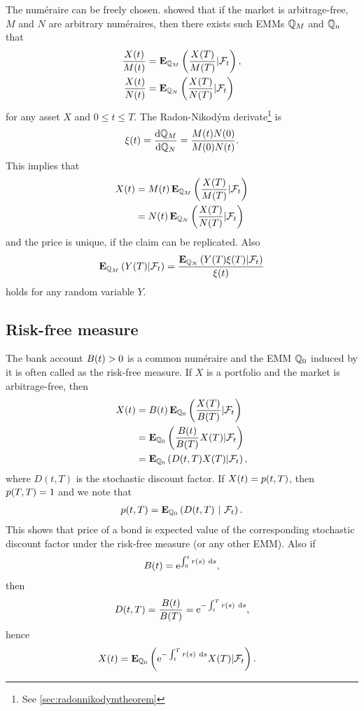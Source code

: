 The num\'{e}raire can be freely chosen. \cite{gemanelkarouirochet1995changes} showed that if the market is arbitrage-free, $M$ and $N$ are arbitrary num\'{e}raires, then there exists such EMMs $\mathbb{Q}_M$ and $\mathbb{Q}_n$ that
	\begin{align}
		\frac{X(t)}{M(t)} &= \operatorname{\boldsymbol{\mathrm{E}}}_{\mathbb{Q}_M} \left( \frac{X(T)}{M(T)} | \mathcal{F}_t \right), \\
		\frac{X(t)}{N(t)} &= \operatorname{\boldsymbol{\mathrm{E}}}_{\mathbb{Q}_N} \left( \frac{X(T)}{N(T)} | \mathcal{F}_t \right)
	\end{align}
for any asset $X$ and $0 \leq t \leq T$. The Radon-Nikod\'{y}m derivate\footnote{See \ref{sec:radonnikodymtheorem}} is
	\begin{align}
		\xi(t) = \frac{\mathrm{d} \mathbb{Q}_M}{\mathrm{d} \mathbb{Q}_N} = \frac{M(t) N(0)}{M(0) N(t)} .
	\end{align}
This implies that
	\begin{align}
		X(t) &= M(t) \operatorname{\boldsymbol{\mathrm{E}}}_{\mathbb{Q}_M} \left( \frac{X(T)}{M(T)} | \mathcal{F}_t \right) \\ 
		&= N(t) \operatorname{\boldsymbol{\mathrm{E}}}_{\mathbb{Q}_N} \left( \frac{X(T)}{N(T)} | \mathcal{F}_t \right)
\end{align}
and the price is unique, if the claim can be replicated. Also
	\begin{align}
		\label{expectationbyradonnikodymderivative}
		\operatorname{\boldsymbol{\mathrm{E}}}_{\mathbb{Q}_M} \left( Y(T) | \mathcal{F}_t \right) = \frac{\operatorname{\boldsymbol{\mathrm{E}}}_{\mathbb{Q}_N} \left( Y(T) \xi(T)  | \mathcal{F}_t \right)}{\xi(t)} 
	\end{align}
holds for any random variable $Y$.

\subsection{Risk-free measure}

The bank account $B(t) > 0$ is a common num\'{e}raire and the EMM $\mathbb{Q}_0$ induced by it is often called as the risk-free measure. If $X$ is a portfolio and the market is arbitrage-free, then
	\begin{align}
		\label{pricingunderriskneutralmeasure}
		X(t) &= B(t) \operatorname{\boldsymbol{\mathrm{E}}}_{\mathbb{Q}_0} \left( \frac{X(T)}{B(T)} | \mathcal{F}_t \right) \\
			&= \operatorname{\boldsymbol{\mathrm{E}}}_{\mathbb{Q}_0} \left( \frac{B(t)}{B(T) } X(T) | \mathcal{F}_t \right) \\
			&= \operatorname{\boldsymbol{\mathrm{E}}}_{\mathbb{Q}_0} \left( D(t,T) X(T)  | \mathcal{F}_t \right),
	\end{align}
where $D(t,T)$ is the stochastic discount factor. If $X(t) = p(t,T)$, then $p(T,T)=1$ and we note that
	\begin{align}
		p(t,T) = \operatorname{\boldsymbol{\mathrm{E}}}_{\mathbb{Q}_0} \left( D(t,T) \ | \ \mathcal{F}_t \right) .
	\end{align}
This shows that price of a bond is expected value of the corresponding stochastic discount factor under the risk-free measure (or any other EMM). Also if
	\begin{align}
		B(t) = \mathrm{e}^{ \int_0^t r(s) \ \mathrm{d} s },
	\end{align}
then
	\begin{align}
		D(t,T) = \frac{B(t)}{B(T)} = \mathrm{e}^{ - \int_t^T r(s) \ \mathrm{d} s },
	\end{align}
hence
	\begin{align}
		X(t) &= \operatorname{\boldsymbol{\mathrm{E}}}_{\mathbb{Q}_0} \left( \mathrm{e}^{ - \int_t^T r(s) \ \mathrm{d} s } X(T)  | \mathcal{F}_t \right) . 
\end{align}	

